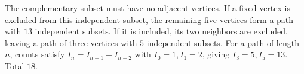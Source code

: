The complementary subset must have no adjacent vertices. If a fixed vertex is excluded from this independent subset, the remaining five vertices form a path with $13$ independent subsets. If it is included, its two neighbors are excluded, leaving a path of three vertices with $5$ independent subsets. For a path of length $n$, counts satisfy $I_n=I_{n-1}+I_{n-2}$ with $I_0=1,I_1=2$, giving $I_3=5,I_5=13$. Total $\boxed{18}$.
